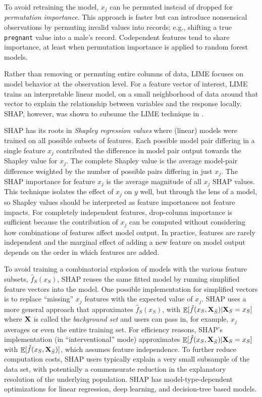 \documentclass[11pt]{article}
\DeclareMathOperator{\Ex}{\mathbb{E}}
\begin{document}
To avoid retraining the model, $x_j$ can be permuted instead of dropped for {\em permutation importance}. This approach is faster but can introduce nonsensical observations by permuting invalid values into records; e.g., shifting a true {\tt\small pregnant} value into a male's record. Codependent features tend to share importance, at least when permutation importance is applied to random forest models.

Rather than removing or permuting entire columns of data, LIME \citep{lime} focuses on model behavior at the observation level. For a feature vector of interest, LIME trains an interpretable linear model, on a small neighborhood of data around that vector to explain the relationship between variables and the response locally. SHAP, however, was shown to subsume the LIME technique in \citep{shap}. 

SHAP has its roots in {\em Shapley regression values} \citep{shapley-regression} where (linear) models were trained on all possible subsets of features.  Each possible model pair differing in a single feature $x_j$ contributed the difference in model pair output towards the Shapley value for $x_j$. The complete Shapley value is the average model-pair difference weighted by the number of possible pairs differing in just $x_j$. The SHAP importance for feature $x_j$ is the average magnitude of all $x_j$ SHAP values.  This technique isolates the effect of $x_j$ on $y$ well, but through the lens of a model, so Shapley values should be interpreted as feature importances not feature impacts. For completely independent features, drop-column importance is sufficient because the contribution of $x_j$ can be computed without considering how combinations of features affect model output.  In practice, features are rarely independent and the marginal effect of adding a new feature on model output depends on the order in which features are added.  

To avoid training a combinatorial explosion of models with the various feature subsets, $\hat{f}_S(x_S)$, SHAP reuses the same fitted model by running simplified feature vectors into the model. One possible implementation for simplified vectors is to replace ``missing'' $x_j$ features with the expected value of $x_j$. SHAP uses a more general approach that approximates $\hat{f}_S(x_S)$, with $\Ex[\hat{f}(x_{S},{\bf X}_{\bar{S}}) | {\bf X}_S = x_S]$ where ${\bf X}$ is called the {\em background set} and users can pass in, for example, $x_j$ averages or even the entire training set.  For efficiency reasons, SHAP's implementation (in ``interventional'' mode)  approximates $\Ex[\hat{f}(x_{S},{\bf X}_{\bar{S}}) | {\bf X}_S = x_S]$ with $\Ex[\hat{f}(x_{S},{\bf X}_{\bar{S}})]$, which assumes feature independence.  To further reduce computation costs, SHAP users typically explain a very small subsample of the data set, with potentially a commensurate reduction in the explanatory resolution of the underlying population. SHAP has model-type-dependent optimizations for linear regression, deep learning, and decision-tree based models.
\end{document}
